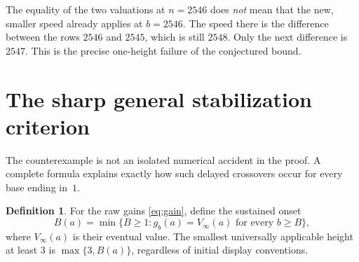 \documentclass[11pt,a4paper]{article}
\theoremstyle{definition}
\newtheorem{definition}[theorem]{Definition}
\theoremstyle{remark}
\begin{document}
The equality of the two valuations at $n=2546$ does \emph{not} mean that the new, smaller speed already applies at $b=2546$. The speed there is the difference between the rows $2546$ and $2545$, which is still $2548$. Only the next difference is $2547$. This is the precise one-height failure of the conjectured bound.

\section{The sharp general stabilization criterion}
\label{sec:onset}

The counterexample is not an isolated numerical accident in the proof. A complete formula explains exactly how such delayed crossovers occur for every base ending in~$1$.

\begin{definition}
For the raw gains \eqref{eq:gain}, define the sustained onset
\[
 B(a)=\min\{B\ge1:g_b(a)=V_\infty(a)\text{ for every }b\ge B\},
\]
where $V_\infty(a)$ is their eventual value. The smallest universally applicable height at least $3$ is $\max\{3,B(a)\}$, regardless of initial display conventions.
\end{definition}
\end{document}
